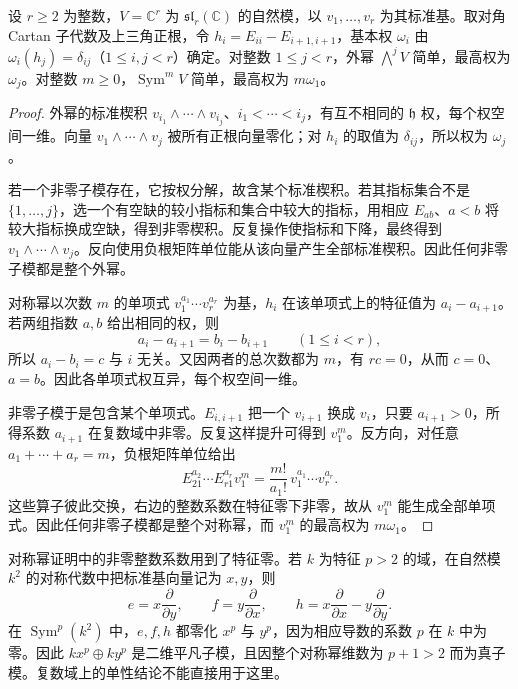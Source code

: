 \begin{proposition}\label{b5:prop:type-a-fundamental-exterior}
	设 \(r\ge2\) 为整数，\(V=\mathbb C^r\) 为 \(\mathfrak{sl}_r(\mathbb C)\) 的自然模，以 \(v_1,\ldots,v_r\) 为其标准基。取对角 Cartan 子代数及上三角正根，令 \(h_i=E_{ii}-E_{i+1,i+1}\)，基本权 \(\omega_i\) 由 \(\omega_i(h_j)=\delta_{ij}\)（\(1\le i,j<r\)）确定。对整数 \(1\le j<r\)，外幂 \(\bigwedge^jV\) 简单，最高权为 \(\omega_j\)。对整数 \(m\ge0\)，\(\operatorname{Sym}^mV\) 简单，最高权为 \(m\omega_1\)。
\end{proposition}
\begin{proof}
	外幂的标准楔积 \(v_{i_1}\wedge\cdots\wedge v_{i_j}\)、\(i_1<\cdots<i_j\)，有互不相同的 \(\mathfrak h\) 权，每个权空间一维。向量 \(v_1\wedge\cdots\wedge v_j\) 被所有正根向量零化；对 \(h_i\) 的取值为 \(\delta_{ij}\)，所以权为 \(\omega_j\)。

	若一个非零子模存在，它按权分解，故含某个标准楔积。若其指标集合不是 \(\{1,\ldots,j\}\)，选一个有空缺的较小指标和集合中较大的指标，用相应 \(E_{ab}\)、\(a<b\) 将较大指标换成空缺，得到非零楔积。反复操作使指标和下降，最终得到 \(v_1\wedge\cdots\wedge v_j\)。反向使用负根矩阵单位能从该向量产生全部标准楔积。因此任何非零子模都是整个外幂。

	对称幂以次数 \(m\) 的单项式 \(v_1^{a_1}\cdots v_r^{a_r}\) 为基，\(h_i\) 在该单项式上的特征值为 \(a_i-a_{i+1}\)。若两组指数 \(a,b\) 给出相同的权，则
	\[
		a_i-a_{i+1}=b_i-b_{i+1}\qquad(1\le i<r),
	\]
	所以 \(a_i-b_i=c\) 与 \(i\) 无关。又因两者的总次数都为 \(m\)，有 \(rc=0\)，从而 \(c=0\)、\(a=b\)。因此各单项式权互异，每个权空间一维。

	非零子模于是包含某个单项式。\(E_{i,i+1}\) 把一个 \(v_{i+1}\) 换成 \(v_i\)，只要 \(a_{i+1}>0\)，所得系数 \(a_{i+1}\) 在复数域中非零。反复这样提升可得到 \(v_1^m\)。反方向，对任意 \(a_1+\cdots+a_r=m\)，负根矩阵单位给出
	\[
		E_{21}^{a_2}\cdots E_{r1}^{a_r}v_1^m =\frac{m!}{a_1!}\,v_1^{a_1}\cdots v_r^{a_r}.
	\]
	这些算子彼此交换，右边的整数系数在特征零下非零，故从 \(v_1^m\) 能生成全部单项式。因此任何非零子模都是整个对称幂，而 \(v_1^m\) 的最高权为 \(m\omega_1\)。
\end{proof}

对称幂证明中的非零整数系数用到了特征零。若 \(k\) 为特征 \(p>2\) 的域，在自然模 \(k^2\) 的对称代数中把标准基向量记为 \(x,y\)，则
\[
	e=x\dfrac{\partial}{\partial y},\qquad f=y\dfrac{\partial}{\partial x},\qquad h=x\dfrac{\partial}{\partial x}-y\dfrac{\partial}{\partial y}.
\]
在 \(\operatorname{Sym}^p(k^2)\) 中，\(e,f,h\) 都零化 \(x^p\) 与 \(y^p\)，因为相应导数的系数 \(p\) 在 \(k\) 中为零。因此 \(kx^p\oplus ky^p\) 是二维平凡子模，且因整个对称幂维数为 \(p+1>2\) 而为真子模。复数域上的单性结论不能直接用于这里。

